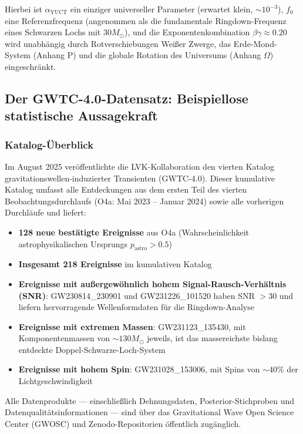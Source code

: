 \documentclass[12pt,a4paper]{article}
\theoremstyle{remark}
\begin{document}
	Hierbei ist $\alpha_{\text{YUCT}}$ ein einziger universeller Parameter (erwartet klein, $\sim 10^{-3}$), $f_0$ eine Referenzfrequenz (angenommen als die fundamentale Ringdown-Frequenz eines Schwarzen Lochs mit $30 M_\odot$), und die Exponentenkombination $\beta\gamma \approx 0.20$ wird unabhängig durch Rotverschiebungen Weißer Zwerge, das Erde-Mond-System (Anhang P) und die globale Rotation des Universums (Anhang $\Omega$) eingeschränkt.
	
	\subsection{Der GWTC-4.0-Datensatz: Beispiellose statistische Aussagekraft}
	
	\subsubsection{Katalog-Überblick}
	
	Im August 2025 veröffentlichte die LVK-Kollaboration den vierten Katalog gravitationswellen-induzierter Transienten (GWTC-4.0). Dieser kumulative Katalog umfasst alle Entdeckungen aus dem ersten Teil des vierten Beobachtungsdurchlaufs (O4a: Mai 2023 – Januar 2024) sowie alle vorherigen Durchläufe und liefert:
	
	\begin{itemize}
		\item \textbf{128 neue bestätigte Ereignisse} aus O4a (Wahrscheinlichkeit astrophysikalischen Ursprungs $p_{\text{astro}} > 0.5$)
		\item \textbf{Insgesamt 218 Ereignisse} im kumulativen Katalog
		\item \textbf{Ereignisse mit außergewöhnlich hohem Signal-Rausch-Verhältnis (SNR)}: GW230814\_230901 und GW231226\_101520 haben SNR $> 30$ und liefern hervorragende Wellenformdaten für die Ringdown-Analyse
		\item \textbf{Ereignisse mit extremen Massen}: GW231123\_135430, mit Komponentenmassen von $\sim 130 M_\odot$ jeweils, ist das massereichste bislang entdeckte Doppel-Schwarze-Loch-System
		\item \textbf{Ereignisse mit hohem Spin}: GW231028\_153006, mit Spins von $\sim 40\%$ der Lichtgeschwindigkeit
	\end{itemize}
	
	Alle Datenprodukte — einschließlich Dehnungsdaten, Posterior-Stichproben und Datenqualitätsinformationen — sind über das Gravitational Wave Open Science Center (GWOSC) und Zenodo-Repositorien öffentlich zugänglich.
	
\end{document}
